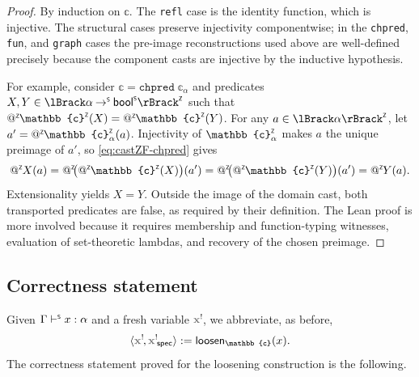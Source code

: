 \begin{proof}
By induction on $\mathbb{c}$. The \texttt{refl} case is the identity function, which is injective. The structural cases preserve injectivity componentwise; in the \texttt{chpred}, \texttt{fun}, and \texttt{graph} cases the pre-image reconstructions used above are well-defined precisely because the component casts are injective by the inductive hypothesis.

For example, consider $\mathbb{c} = \mathtt{chpred}\;\mathbb{c}_\alpha$ and predicates
$X,Y \in \interpZ{\alpha \toS \boolS}$ such that
$\appZ\zop{\mathbb{c}}(X) = \appZ\zop{\mathbb{c}}(Y)$.
For any $a \in \interpZ{\alpha}$, let $a' = \appZ\zop{\mathbb{c}}_\alpha(a)$.
Injectivity of $\zop{\mathbb{c}}_\alpha$ makes $a$ the unique preimage of $a'$, so
\eqref{eq:castZF-chpred} gives
\[
  \appZ X(a)
  = \appZ\bigl(\appZ\zop{\mathbb{c}}(X)\bigr)(a')
  = \appZ\bigl(\appZ\zop{\mathbb{c}}(Y)\bigr)(a')
  = \appZ Y(a).
\]
Extensionality yields $X = Y$. Outside the image of the domain cast, both
transported predicates are false, as required by their definition.
The Lean proof is more involved because it requires membership and function-typing
witnesses, evaluation of set-theoretic lambdas, and recovery of the chosen preimage.
\end{proof}

\subsection{Correctness statement}

Given $\Gamma \vdash^{\scriptscriptstyle{\mathsf{S}}} x : \alpha$ and a fresh variable $\lvar{x}$, we abbreviate, as before,
\[
\langle \lvar{x}, \spec{\lvar{x}} \rangle := \mathsf{loosen}_{\mathbb{c}}(x).
\]
The correctness statement proved for the loosening construction is the following.

